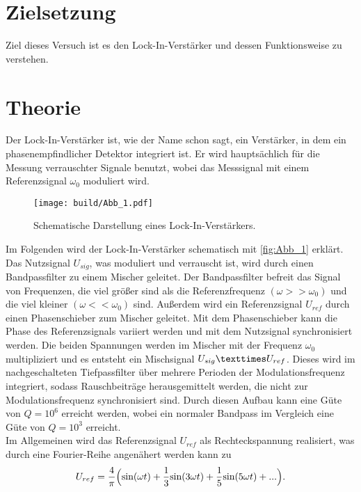 \section{Zielsetzung}
\label{sec:Zielsetzung}
Ziel dieses Versuch ist es den Lock-In-Verstärker und dessen Funktionsweise zu verstehen.

\section{Theorie}
\label{sec:Theorie}
 Der Lock-In-Verstärker ist, wie der Name schon sagt, ein Verstärker, in dem ein phasenempfindlicher Detektor integriert ist.
 Er wird hauptsächlich für die Messung verrauschter Signale benutzt, wobei das Messsignal mit einem Referenzsignal $\omega_0$ moduliert wird.
 \begin{figure}[H]
    \centering
    \texttt{[image: build/Abb\_1.pdf]}
    \caption {Schematische Darstellung eines Lock-In-Verstärkers\cite[1]{V303}.}
    \label{fig:Abb_1}
\end{figure}
Im Folgenden wird der Lock-In-Verstärker schematisch mit \autoref{fig:Abb_1} erklärt.
Das Nutzsignal $U_{sig}$, was moduliert und verrauscht ist, wird durch einen Bandpassfilter zu einem Mischer geleitet.
Der Bandpassfilter befreit das Signal von Frequenzen, die viel größer sind als die Referenzfrequenz $(\omega >> \omega_0)$ und die viel kleiner $(\omega << \omega_0)$ sind.
Außerdem wird ein Referenzsignal $U_{ref}$ durch einen Phasenschieber zum Mischer geleitet.
Mit dem Phasenschieber kann die Phase des Referenzsignals variiert werden und mit dem Nutzsignal synchronisiert werden.
Die beiden Spannungen werden im Mischer mit der Frequenz $\omega_0$ multipliziert und es entsteht ein Mischsignal $U_{sig} \texttimes U_{ref}$.
Dieses wird im nachgeschalteten Tiefpassfilter über mehrere Perioden der Modulationsfrequenz integriert, sodass Rauschbeiträge herausgemittelt werden, die nicht zur Modulationsfrequenz synchronisiert sind.
Durch diesen Aufbau kann eine Güte von $Q = 10^6$ erreicht werden, wobei ein normaler Bandpass im Vergleich eine Güte von $Q=10^3$ erreicht.\\
Im Allgemeinen wird das Referenzsignal $U_{ref}$ als Rechteckspannung realisiert, was durch eine Fourier-Reihe angenähert werden kann zu
\begin{equation}
    U_{ref} =\frac{4}{\pi}\Bigl( \text{sin}(\omega t) + \frac{1}{3}\text{sin}(3\omega t) + \frac{1}{5}\text{sin}(5\omega t) + ... \Bigr).
    \label{eqn:Referenzsignal}
\end{equation}
